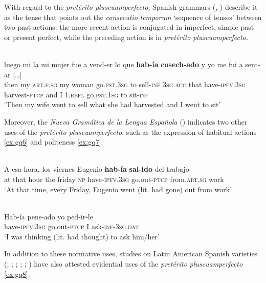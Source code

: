 \documentclass[output=paper]{langsci/langscibook}
\begin{document}
With regard to the \textit{pretérito pluscuamperfecto}, Spanish grammars (\citealt{HernandezAlonso1986}, \citealt{Cartagena1999}) describe it as the tense that points out the \textit{consecutio} \textit{temporum} ‘sequence of tenses’ between two past actions: the more recent action is conjugated in imperfect, simple past or present perfect, while the preceding action is in \textit{pretérito} \textit{pluscuamperfecto.}


\ea  \label{ex:gq5}
	\\
	\gll […] luego mi la mi mujer fue a vend-er lo que \textbf{hab-ía} \textbf{cosech-ado} y yo me fui a sent-ar […]\\
	then my \textsc{art.f.sg} my woman go.\textsc{pst.3sg} to sell-\textsc{inf} \textsc{3sg.acc} that have-\textsc{ipfv.3sg} harvest-\textsc{ptcp} and I \textsc{1.refl} go.\textsc{pst.1sg} to sit-\textsc{inf}\\
	\glt ‘Then my wife went to sell what she had harvested and I went to sit’
\z 

Moreover, the \textit{Nueva Gramática de la Lengua Española} (\citeyear[542]{RealAcademia2010}) indicates two other uses of the \textit{pretérito pluscuamperfecto}, such as the expression of habitual actions \ref{ex:gq6} and politeness \ref{ex:gq7}.


\ea \label{ex:gq6}
\\ %
\gll A esa hora, los viernes Eugenio \textbf{hab-ía} \textbf{sal-ido} del trabajo\\
at that hour the friday \textsc{np} have-\textsc{ipfv.3sg} go.out-\textsc{ptcp} from.\textsc{art.sg} work\\
\glt ‘At that time, every Friday, Eugenio went (lit. had gone) out from work’
\z


\ea  \label{ex:gq7}
	\\
	\gll Hab-ía pens-ado yo ped-ir-le\\
	have-\textsc{ipfv.3sg} go.out-\textsc{ptcp} I ask-\textsc{inf-3sg.dat}\\
	\glt ‘I was thinking (lit. had thought) to ask him/her’
\z 


In addition to these normative uses, studies on Latin American Spanish varieties (\citealt{Laprade1981}; \citealt{Mendoza1991};  \citealt{CallisayaApaza2012}; \citealt{Adelaar2004}; \citealt{Speranza2014}; \citealt{Bermudez2008}) have also attested evidential uses of the \textit{pretérito} \textit{pluscuamperfecto} \ref{ex:gq8}. 
\end{document}
